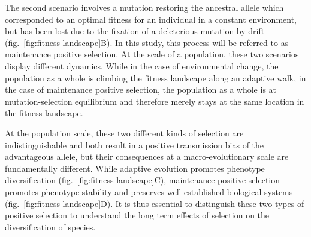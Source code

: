 \documentclass{article}
\begin{document}
    The second scenario involves a mutation restoring the ancestral allele which corresponded to an optimal fitness for an individual in a constant environment, but has been lost due to the fixation of a deleterious mutation by drift (fig.~\ref{fig:fitness-landscape}B).
    In this study, this process will be referred to as maintenance positive selection.
    At the scale of a population, these two scenarios display different dynamics.
    While in the case of environmental change, the population as a whole is climbing the fitness landscape along an adaptive walk\cite{tenaillon_utility_2014}, in the case of maintenance positive selection, the population as a whole is at mutation-selection equilibrium and therefore merely stays at the same location in the fitness landscape\cite{sella_application_2005, mustonen_fitness_2009}.

    At the population scale, these two different kinds of selection are indistinguishable and both result in a positive transmission bias of the advantageous allele, but their consequences at a macro-evolutionary scale are fundamentally different.
    While adaptive evolution promotes phenotype diversification (fig.~\ref{fig:fitness-landscape}C), maintenance positive selection promotes phenotype stability and preserves well established biological systems (fig.~\ref{fig:fitness-landscape}D).
    It is thus essential to distinguish these two types of positive selection to understand the long term effects of selection on the diversification of species.
\end{document}
